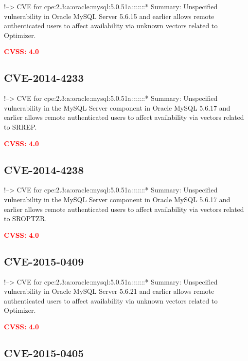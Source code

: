 \documentclass[a4paper, 12pt]{article}
\begin{document}
!--\textgreater{} CVE for
cpe:2.3:a:oracle:mysql:5.0.51a:\emph{:}:\emph{:}:\emph{:}:* Summary:
Unspecified vulnerability in Oracle MySQL Server 5.6.15 and earlier
allows remote authenticated users to affect availability via unknown
vectors related to Optimizer.

\textbf{\textcolor{red}{CVSS: 4.0}}

\hypertarget{cve-2014-4233}{%
\subsection{CVE-2014-4233}\label{cve-2014-4233}}

!--\textgreater{} CVE for
cpe:2.3:a:oracle:mysql:5.0.51a:\emph{:}:\emph{:}:\emph{:}:* Summary:
Unspecified vulnerability in the MySQL Server component in Oracle MySQL
5.6.17 and earlier allows remote authenticated users to affect
availability via vectors related to SRREP.

\textbf{\textcolor{red}{CVSS: 4.0}}

\hypertarget{cve-2014-4238}{%
\subsection{CVE-2014-4238}\label{cve-2014-4238}}

!--\textgreater{} CVE for
cpe:2.3:a:oracle:mysql:5.0.51a:\emph{:}:\emph{:}:\emph{:}:* Summary:
Unspecified vulnerability in the MySQL Server component in Oracle MySQL
5.6.17 and earlier allows remote authenticated users to affect
availability via vectors related to SROPTZR.

\textbf{\textcolor{red}{CVSS: 4.0}}

\hypertarget{cve-2015-0409}{%
\subsection{CVE-2015-0409}\label{cve-2015-0409}}

!--\textgreater{} CVE for
cpe:2.3:a:oracle:mysql:5.0.51a:\emph{:}:\emph{:}:\emph{:}:* Summary:
Unspecified vulnerability in Oracle MySQL Server 5.6.21 and earlier
allows remote authenticated users to affect availability via unknown
vectors related to Optimizer.

\textbf{\textcolor{red}{CVSS: 4.0}}

\hypertarget{cve-2015-0405}{%
\subsection{CVE-2015-0405}\label{cve-2015-0405}}
\end{document}
